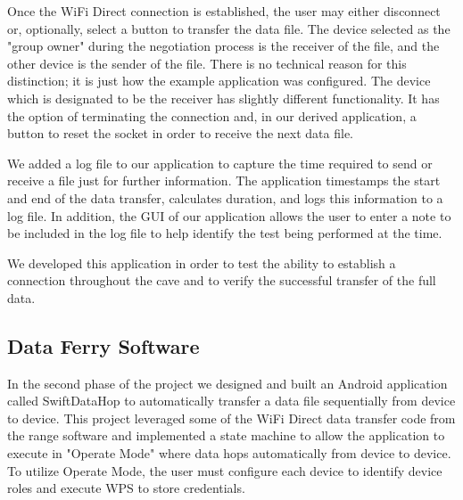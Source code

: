 \documentclass[10pt,twocolumn]{article}
\begin{document}
Once the WiFi Direct connection is established, the user may either disconnect or, optionally, select a button to transfer the data file.
The device selected as the "group owner" during the negotiation process is the receiver of the file, and the other device is the sender of the file.
There is no technical reason for this distinction; it is just how the example application was configured.
The device which is designated to be the receiver has slightly different functionality.
It has the option of terminating the connection and, in our derived application, a button to reset the socket in order to receive the next data file.

We added a log file to our application to capture the time required to send or receive a file just for further information.
The application timestamps the start and end of the data transfer, calculates duration, and logs this information to a log file.
In addition, the GUI of our application allows the user to enter a note to be included in the log file to help identify the test being performed at the time.

We developed this application in order to test the ability to establish a connection throughout the cave and to verify the successful transfer of the full data.

\subsection{Data Ferry Software}
\label{sec:Data Ferry Software}
In the second phase of the project we designed and built an Android application called SwiftDataHop to automatically transfer a data file sequentially from device to device. 
This project leveraged some of the WiFi Direct data transfer code from the range software and implemented a state machine to allow the application to execute in "Operate Mode" where data hops automatically from device to device. 
To utilize Operate Mode, the user must configure each device to identify device roles and execute WPS to store credentials.
\end{document}
